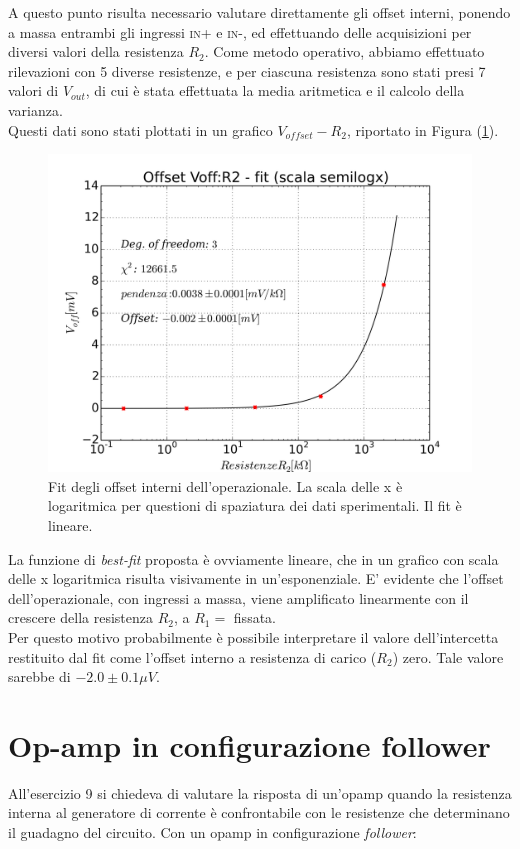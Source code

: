 \documentclass[journal, a4paper]{IEEEtran}
\begin{document}
A questo punto risulta necessario valutare direttamente gli offset interni, ponendo a massa entrambi gli ingressi \textsc{in+} e \textsc{in-}, ed effettuando delle acquisizioni per diversi valori della resistenza $R_2$. Come metodo operativo, abbiamo effettuato rilevazioni con 5 diverse resistenze, e per ciascuna resistenza sono stati presi 7 valori di $V_{out}$, di cui è stata effettuata la media aritmetica e il calcolo della varianza. \\
Questi dati sono stati plottati in un grafico $V_{offset} - R_2$, riportato in Figura (\ref{fig:fit_offset}).\\


\begin{figure}
\centering
\includegraphics[width=0.9\linewidth]{./fit_offset}
\caption{Fit degli offset interni dell'operazionale. La scala delle x è logaritmica per questioni di spaziatura dei dati sperimentali. Il fit è lineare.}
\label{fig:fit_offset}
\end{figure}

La funzione di \textit{best-fit} proposta è ovviamente lineare, che in un grafico con scala delle x logaritmica risulta visivamente in un'esponenziale. E' evidente che l'offset dell'operazionale, con ingressi a massa, viene amplificato linearmente con il crescere della resistenza $R_2$, a $R_1 = $ fissata.\\

Per questo motivo probabilmente è possibile interpretare il valore dell'intercetta restituito dal fit come l'offset interno a resistenza di carico ($R_2$) zero. Tale valore sarebbe di $-2.0 \pm 0.1 \mu \si{V} $. 


\section{Op-amp in configurazione follower}
All'esercizio 9 si chiedeva di valutare la risposta di un'opamp quando la resistenza interna al generatore di corrente è confrontabile con le resistenze che determinano il guadagno del circuito. Con un opamp in configurazione \textit{follower}:\\
\end{document}
